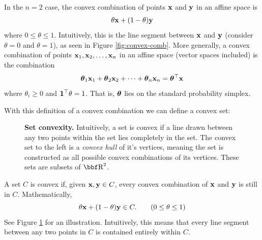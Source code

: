\documentclass{article}
\begin{document}
\begin{definition}
    In the $n=2$ case, the convex combination of points ${\bf x}$ and ${\bf y}$ in an
    affine space is
    \[
        \theta{\bf x} + (1-\theta){\bf y}
    \]
    where $0\leq\theta\leq1$. Intuitively, this is the line segment between
    ${\bf x}$ and ${\bf y}$ (consider $\theta=0$ and $\theta=1$), as seen in Figure
    \ref{fig:convex-comb}. More generally,
    a convex combination of points ${\bf x}_1,{\bf x}_2,\dots,{\bf x}_n$ in an affine space (vector
    spaces included) is the combination
    \[
        \hbox{\boldmath$\theta$}_1{\bf x}_1 + \hbox{\boldmath$\theta$}_2{\bf x}_2 + \dots + \hbox{\boldmath$\theta$}_n{\bf x}_n = \hbox{\boldmath$\theta$}^\top{\bf x}
    \]
    where $\theta_i \geq 0$ and ${\bf 1}^\top\theta = 1$. That is, $\hbox{\boldmath$\theta$}$ lies on the
    standard probability simplex.  
\end{definition}

With this definition of a convex combination we can define
a convex set:

\begin{figure}
    \centering
    \begin{center}
    \end{center}
    \caption{{\bf Set convexity.} Intuitively, a set is convex
    if a line drawn between any two points within the set lies completely in the set. The convex set
    to the left is a \textit{convex hull} of it's vertices, meaning the set is constructed
    as all possible convex combinations of its vertices. These sets are subsets of $\RR^2$.}
    \label{fig:convex-sets}
\end{figure}

\begin{definition}
    A set $C$ is convex if, given ${\bf x},{\bf y} \in C$, every convex combination
    of ${\bf x}$ and ${\bf y}$ is still in $C$. Mathematically,
    \[
        \theta{\bf x} + (1-\theta){\bf y} \in C. \tag{$0\leq\theta\leq1$}
    \]
    See Figure \ref{fig:convex-sets} for an illustration. Intuitively, this
    means that every line segment between any two points in $C$ is contained
    entirely within $C$.
\end{definition}
\end{document}
